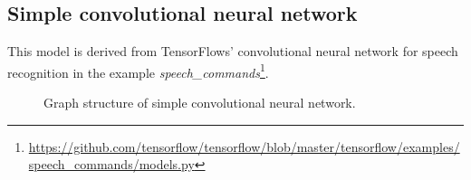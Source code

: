 \subsection*{Simple convolutional neural network}
This model is derived from  TensorFlows' convolutional neural network for speech recognition in the example \textit{speech\_commands}\footnote{\url{https://github.com/tensorflow/tensorflow/blob/master/tensorflow/examples/speech\_commands/models.py}}.
\begin{figure}[h]
	\centering
	\caption[Simple convolutional structure]{Graph structure of simple convolutional neural network.}
\end{figure}
\FloatBarrier

\newpage
